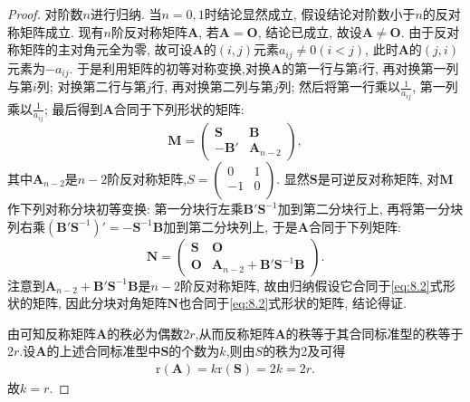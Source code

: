 \documentclass[../../main.tex]{subfiles}%
\begin{document}
\begin{proof}

对阶数$n$进行归纳. 当$n = 0, 1$时结论显然成立, 假设结论对阶数小于$n$的反对称矩阵成立. 现有$n$阶反对称矩阵$\boldsymbol{A}$, 若$\boldsymbol{A}=\boldsymbol{O}$, 结论已成立, 故设$\boldsymbol{A}\neq\boldsymbol{O}$. 由于反对称矩阵的主对角元全为零, 故可设$\boldsymbol{A}$的$(i, j)$元素$a_{ij}\neq 0 (i < j)$, 此时$\boldsymbol{A}$的$(j, i)$元素为$-a_{ij}$. 于是利用矩阵的初等对称变换,对换$\boldsymbol{A}$的第一行与第$i$行, 再对换第一列与第$i$列; 对换第二行与第$j$行, 再对换第二列与第$j$列; 然后将第一行乘以$\frac{1}{a_{ij}}$, 第一列乘以$\frac{1}{a_{ij}}$; 最后得到$\boldsymbol{A}$合同于下列形状的矩阵:
\[
\boldsymbol{M}=\begin{pmatrix}
\boldsymbol{S} & \boldsymbol{B} \\
-\boldsymbol{B}' & \boldsymbol{A}_{n - 2}
\end{pmatrix},
\]
其中$\boldsymbol{A}_{n - 2}$是$n - 2$阶反对称矩阵,$S=\left( \begin{matrix}
0&		1\\
-1&		0\\
\end{matrix} \right) $. 显然$\boldsymbol{S}$是可逆反对称矩阵, 对$\boldsymbol{M}$作下列对称分块初等变换: 第一分块行左乘$\boldsymbol{B}'\boldsymbol{S}^{-1}$加到第二分块行上, 再将第一分块列右乘$(\boldsymbol{B}'\boldsymbol{S}^{-1})'=-\boldsymbol{S}^{-1}\boldsymbol{B}$加到第二分块列上, 于是$\boldsymbol{A}$合同于下列矩阵:
\[
\boldsymbol{N}=\begin{pmatrix}
\boldsymbol{S} & \boldsymbol{O} \\
\boldsymbol{O} & \boldsymbol{A}_{n - 2}+\boldsymbol{B}'\boldsymbol{S}^{-1}\boldsymbol{B}
\end{pmatrix}.
\]
注意到$\boldsymbol{A}_{n - 2}+\boldsymbol{B}'\boldsymbol{S}^{-1}\boldsymbol{B}$是$n - 2$阶反对称矩阵, 故由归纳假设它合同于\eqref{eq:8.2}式形状的矩阵, 因此分块对角矩阵$\boldsymbol{N}$也合同于\eqref{eq:8.2}式形状的矩阵, 结论得证.

由可知反称矩阵$\boldsymbol{A}$的秩必为偶数$2r$,从而反称矩阵$\boldsymbol{A}$的秩等于其合同标准型的秩等于$2r$.设$\boldsymbol{A}$的上述合同标准型中$\boldsymbol{S}$的个数为$k$,则由$S$的秩为2及可得
\begin{align*}
\mathrm{r}\left( \boldsymbol{A} \right) =k\mathrm{r}\left( \boldsymbol{S} \right) =2k=2r.
\end{align*}
故$k=r$.

\end{proof}
\end{document}
